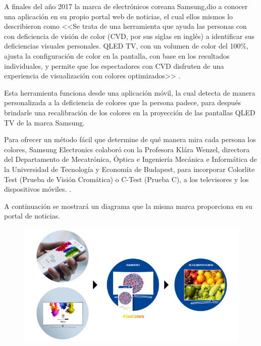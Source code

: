 \documentclass[10pt]{article}
\begin{document}
A finales del año 2017 la marca de electrónicos coreana Samsung\textregistered,\space dio a conocer una aplicación en su propio portal web de noticias, el cual ellos mismos lo describieron como <<Se trata de una herramienta que ayuda las personas con con deficiencia de visión de color (CVD, por sus siglas en inglés) a identificar sus deficiencias visuales personales. QLED TV, con un volumen de color del 100\%, ajusta la configuración de color en la pantalla, con base en los resultados individuales, y permite que los espectadores con CVD disfruten de una experiencia de visualización con colores optimizados>> \cite{IEEEreferencias:Ref19}. \newline

\setlength{\parskip}{2mm}

Esta herramienta funciona desde una aplicación móvil, la cual detecta de manera personalizada a la deficiencia de colores que la persona padece, para después brindarle una recalibración de los colores en la proyección de las pantallas QLED TV de la marca Samsung\textregistered \cite{IEEEreferencias:Ref19}. \newline

\setlength{\parskip}{2mm}

Para ofrecer un método fácil que determine de qué manera mira cada persona los colores, Samsung Electronics colaboró con la Profesora Klára Wenzel, directora del Departamento de Mecatrónica, Óptica e Ingeniería Mecánica e Informática de la Universidad de Tecnología y Economía de Budapest, para incorporar Colorlite Test (Prueba de Visión Cromática) o C-Test (Prueba C), a los televisores y los dispositivos móviles.
\cite{IEEEreferencias:Ref19}.

\setlength{\parskip}{2mm}

A continuación se mostrará un diagrama que la misma marca proporciona en su portal de noticias. \newline

\begin{figure}[H]
	\begin{center}
\includegraphics[scale = 1.40]{Imagenes/Samsung-SeeColors-App-for-QLED-TV_main_2.jpg}
	\end{center} 
\end{figure}
\end{document}
